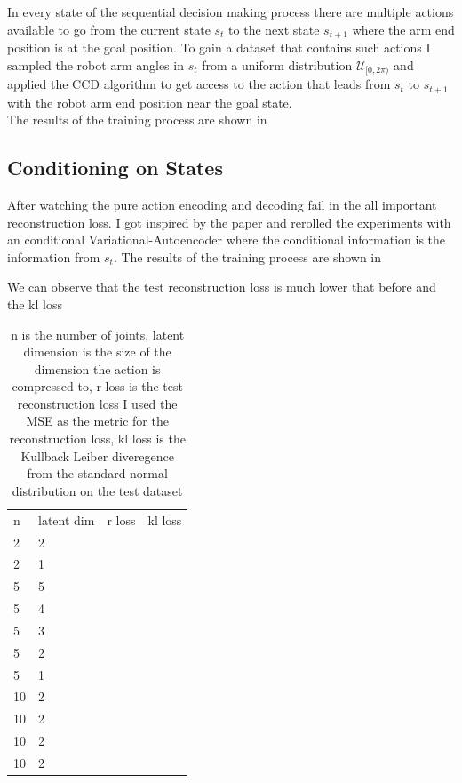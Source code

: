 In every state of the sequential decision making process there are multiple actions available to go from the current state $s_t$ to the next state $s_{t+1}$ where the arm end position is at the goal position. To gain a dataset that contains such actions I sampled the robot arm angles in $s_t$ from a uniform distribution $\mathcal{U}_{[0, 2\pi)}$ and applied the CCD algorithm to get access to the action that leads from $s_t$ to $s_{t+1}$ with the robot arm end position near the goal state. \\

The results of the training process are shown in \figref{}

\subsection{Conditioning on States}

After watching the pure action encoding and decoding fail in the all important reconstruction loss. I got inspired by the paper  and rerolled the experiments with an conditional Variational-Autoencoder where the conditional information is the information from $s_t$. 
The results of the training process are shown in \figref{}

We can observe that the test reconstruction loss is much lower that before and the kl loss

\begin{table}[]
    \centering
    \begin{tabular}{l|l|r|r}
         n & latent dim & r loss & kl loss\\
         2 & 2 & & \\
         2 & 1 & & \\
         5 & 5 & & \\
         5 & 4 & & \\
         5 & 3 & & \\
         5 & 2 & & \\
         5 & 1 & & \\
         10 & 2 & & \\
         10 & 2 & & \\
         10 & 2 & & \\
         10 & 2 & & \\
    \end{tabular}
    \caption{n is the number of joints, latent dimension is the size of the dimension the action is compressed to, r loss is the test reconstruction loss I used the MSE as the metric for the reconstruction loss, kl loss is the Kullback Leiber diveregence from the standard normal distribution on the test dataset}
    \label{tab:CVAE results}
\end{table}

